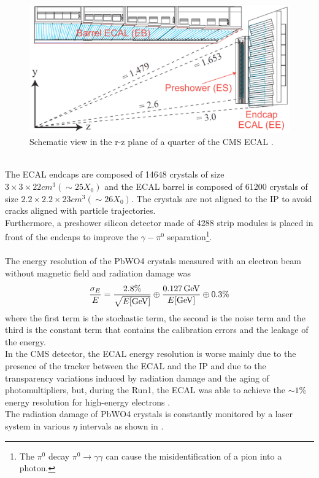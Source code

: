 \begin{figure}[h!]
    \centering
    \includegraphics[width=0.7\linewidth]{fig/chap03-cms/ecal.png}
    \caption{Schematic view in the r-z plane of a quarter of the CMS ECAL \cite{Benaglia2014TheExamples}.}
    \label{fig:ecal}
\end{figure}
\\
The ECAL endcaps are composed of 14648 crystals of size $3\times3\times22 cm^3 (\sim25X_0)$ and the ECAL barrel is composed of 61200 crystals of size $2.2\times2.2\times23 cm^3 (\sim26X_0)$. The crystals are not aligned to the IP to avoid cracks aligned with particle trajectories.\\
Furthermore, a preshower silicon detector made of 4288 strip modules is placed in front of the endcaps to improve the $\gamma-\pi^0$ separation\footnote{The $\pi^0$ decay $\pi^0 \to \gamma \gamma$ can cause the misidentification of a pion into a photon.}.
\\
\\
The energy resolution of the PbWO4 crystals measured with an electron beam without magnetic field and radiation damage was \cite{Adzic2007EnergyCalorimeter} 
\begin{equation}
    {\frac{\sigma_{E}}{E}}={\frac{2.8\%}{\sqrt{E[{\mathrm{GeV}}]}}}\oplus{\frac{0.127 {\ensuremath{\,\text{Ge\hspace{-.08em}V}}}}{E[{\mathrm{GeV}}]}}\oplus0.3\%
\end{equation}
where the first term is the stochastic term, the second is the noise term and the third is the constant term that contains the calibration errors and the leakage of the energy.\\
In the CMS detector, the ECAL energy resolution is worse mainly due to the presence of the tracker between the ECAL and the IP and due to the transparency variations induced by radiation damage and the aging of photomultipliers, but, during the Run1, the ECAL was able to achieve the $\sim1\%$ energy resolution for high-energy electrons \cite{Chatrchyan2013EnergyTeV}.\\
The radiation damage of PbWO4 crystals is constantly monitored by a laser system in various $\eta$ intervals as shown in .
